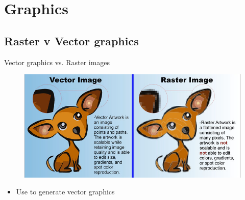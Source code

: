 \documentclass[10pt,times]{beamer}
\subtitle{Part II: Writing papers and thesis using \LaTeX}
\begin{document}
\begin{frame}
  \titlepage
\end{frame}
\section{Graphics}

\subsection{Raster v Vector graphics}
\begin{frame}{Vector graphics vs. Raster images}
\begin{figure}
\includegraphics[width=\textwidth]{figs/vector_vs_raster.jpg}
\end{figure}
\begin{itemize}
\item Use  to generate vector graphics
\end{itemize}
\end{frame}

\end{document}
